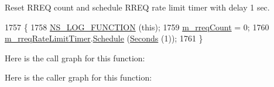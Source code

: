 Reset R\+R\+EQ count and schedule R\+R\+EQ rate limit timer with delay 1 sec. 


\begin{DoxyCode}
1757 \{
1758   \hyperlink{log-macros-disabled_8h_a90b90d5bad1f39cb1b64923ea94c0761}{NS\_LOG\_FUNCTION} (\textcolor{keyword}{this});
1759   \hyperlink{classns3_1_1aodv_1_1RoutingProtocol_a942f693d81f870c9ed9f155effae9577}{m\_rreqCount} = 0;
1760   \hyperlink{classns3_1_1aodv_1_1RoutingProtocol_ac8ad71cc3349d46b7740f59dd18b91b0}{m\_rreqRateLimitTimer}.\hyperlink{classns3_1_1Timer_ac3345d696887578f518b19f359f7f94b}{Schedule} (\hyperlink{group__timecivil_ga33c34b816f8ff6628e33d5c8e9713b9e}{Seconds} (1));
1761 \}
\end{DoxyCode}


Here is the call graph for this function\+:




Here is the caller graph for this function\+:


